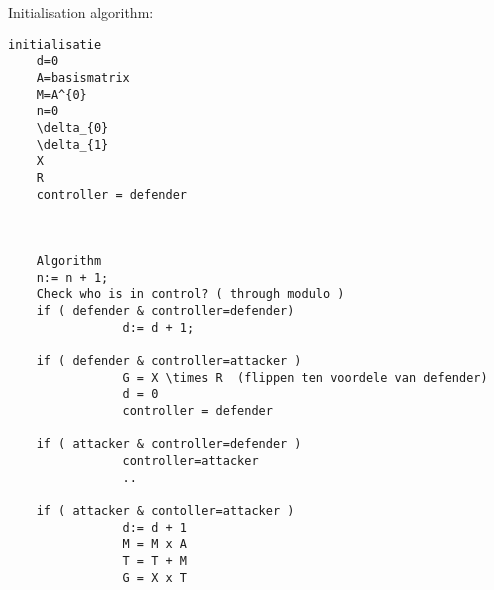 Initialisation algorithm:


\begin{verbatim}
initialisatie
	d=0
	A=basismatrix
	M=A^{0}
	n=0
	\delta_{0}
	\delta_{1}
	X
	R
	controller = defender
	
	

	Algorithm
	n:= n + 1;
	Check who is in control? ( through modulo )
	if ( defender & controller=defender)
				d:= d + 1;
	
	if ( defender & controller=attacker )
				G = X \times R  (flippen ten voordele van defender)
				d = 0
				controller = defender
				
	if ( attacker & controller=defender )
				controller=attacker
				..
				
	if ( attacker & contoller=attacker )
				d:= d + 1
				M = M x A
				T = T + M
				G = X x T
				
		
\end{verbatim}

%